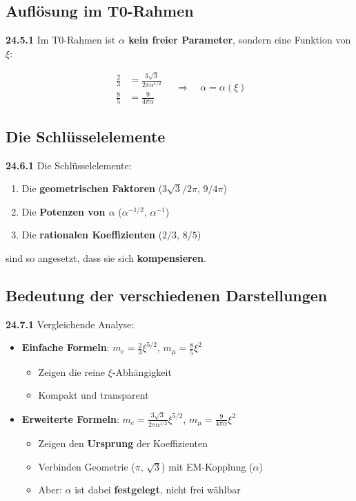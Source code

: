 \subsection{Auflösung im T0-Rahmen}

\noindent \textbf{24.5.1} Im T0-Rahmen ist \textbf{$\alpha$ kein freier Parameter}, sondern eine Funktion von $\xi$:

\[
\boxed{
	\begin{aligned}
		\frac{2}{3} &= \frac{3\sqrt{3}}{2\pi\alpha^{1/2}} \\
		\frac{8}{5} &= \frac{9}{4\pi\alpha}
	\end{aligned}
	\quad \Rightarrow \quad
	\alpha = \alpha(\xi)
}
\]

\subsection{Die Schlüsselelemente}

\noindent \textbf{24.6.1} Die Schlüsselelemente:
\begin{enumerate}
	\item Die \textbf{geometrischen Faktoren} ($3\sqrt{3}/2\pi$, $9/4\pi$)
	\item Die \textbf{Potenzen von $\alpha$} ($\alpha^{-1/2}$, $\alpha^{-1}$)  
	\item Die \textbf{rationalen Koeffizienten} ($2/3$, $8/5$)
\end{enumerate}

\noindent sind so angesetzt, dass sie sich \textbf{kompensieren}.

\subsection{Bedeutung der verschiedenen Darstellungen}

\noindent \textbf{24.7.1} Vergleichende Analyse:
\begin{itemize}
	\item \textbf{Einfache Formeln}: $m_e = \frac{2}{3}\xi^{5/2}$, $m_\mu = \frac{8}{5}\xi^2$
	\begin{itemize}
		\item Zeigen die reine $\xi$-Abhängigkeit
		\item Kompakt und transparent
	\end{itemize}
	
	\item \textbf{Erweiterte Formeln}: $m_e = \frac{3\sqrt{3}}{2\pi\alpha^{1/2}}\xi^{5/2}$, $m_\mu = \frac{9}{4\pi\alpha}\xi^2$
	\begin{itemize}
		\item Zeigen den \textbf{Ursprung} der Koeffizienten
		\item Verbinden Geometrie ($\pi$, $\sqrt{3}$) mit EM-Kopplung ($\alpha$)
		\item Aber: $\alpha$ ist dabei \textbf{festgelegt}, nicht frei wählbar
	\end{itemize}
\end{itemize}

